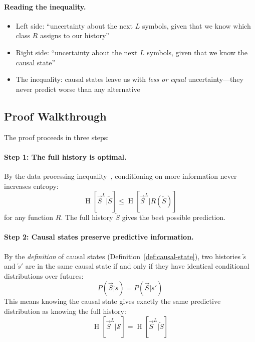 \documentclass[11pt,a4paper]{article}
\theoremstyle{definition}
\theoremstyle{plain}
\newcommand{\calS}{\mathcal{S}}
\newcommand{\Past}{\overleftarrow{S}}
\newcommand{\Future}{\overrightarrow{S}}
\newcommand{\past}{\overleftarrow{s}}
\DeclareMathOperator{\Ent}{H}
\begin{document}
\paragraph{Reading the inequality.}
\begin{itemize}[nosep]
    \item Left side: ``uncertainty about the next $L$ symbols, given that we know which class $R$ assigns to our history''
    \item Right side: ``uncertainty about the next $L$ symbols, given that we know the causal state''
    \item The inequality: causal states leave us with \emph{less or equal} uncertainty---they never predict worse than any alternative
\end{itemize}

\subsection{Proof Walkthrough}

The proof proceeds in three steps:

\paragraph{Step 1: The full history is optimal.}
By the data processing inequality~\cite{cover2006elements}, conditioning on more information never increases entropy:
\begin{equation}
    \Ent[\Future^L | \Past] \leq \Ent[\Future^L | R(\Past)]
\end{equation}
for any function $R$. The full history $\Past$ gives the best possible prediction.

\paragraph{Step 2: Causal states preserve predictive information.}
By the \emph{definition} of causal states (Definition~\ref{def:causal-state}), two histories $\past$ and $\past'$ are in the same causal state if and only if they have identical conditional distributions over futures:
\begin{equation}
    P(\Future | \past) = P(\Future | \past')
\end{equation}
This means knowing the causal state gives exactly the same predictive distribution as knowing the full history:
\begin{equation}
    \Ent[\Future^L | \calS] = \Ent[\Future^L | \Past]
\end{equation}
\end{document}

